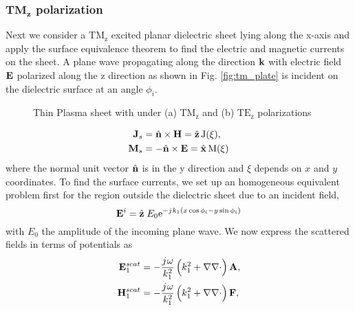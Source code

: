 \documentclass[12pt]{article}
\begin{document}
\subsubsection{$\mathbf{TM_z}$ polarization}
%
Next we consider a $\mathrm{TM_z}$ excited planar dielectric sheet lying along the x-axis and apply the surface equivalence theorem to find the electric and magnetic currents on the sheet. A plane wave propagating along the direction $\mathbf{k}$ with electric field $\mathbf{E}$ polarized along the z direction as shown in Fig. \ref{fig:tm_plate} is incident on the dielectric surface at an angle $\phi_i$.
%
\begin{figure}[b!]
  \centering
   \hfil
  \caption{Thin Plasma sheet with under (a) $\mathrm{TM_z}$ and (b) $\mathrm{TE_z}$ polarizations}
  \label{fig:thinsheets}
\end{figure}
%
\begin{subequations}
  \begin{align}
    \mathbf{J}_s &=  \hat{\mathbf{n}} \times \mathbf{H} = \hat {\mathbf{z}} \, \mathrm{J(\xi)},
    \label{eq:J_s}\\
    \mathbf{M}_s &=  -\hat{\mathbf{n}} \times \mathbf{E} = \hat {\mathbf{x}} \, \mathrm{M(\xi)}
    \label{eq:M_s}
  \end{align}
  \label{eq:eq_currents}%
\end{subequations}%
%
where the normal unit vector $\hat{\mathbf{n}}$ is in the y direction and $\xi$ depends on $x$ and $y$ coordinates. To find the surface currents, we set up an homogeneous equivalent problem first for the region outside the dielectric sheet due to an incident field,
%
\begin{equation}
  \mathbf{E}^i = \hat{\mathbf{z}} \; E_0  \mathrm{e}^{-{j}\mkern1mu k_1 (x \cos \phi_i - y \sin \phi_i)}
  \label{eq:E_i}
\end{equation}
%
with $E_0$ the amplitude of the incoming plane wave. We now express the scattered fields in terms of potentials as
%
\begin{subequations}
  \begin{align}
    \mathbf{E}_1^{scat} &=  -\frac{{j}\mkern1mu \omega}{k_1^2}\left( k_1^2 + \nabla \nabla \cdot \right) \mathbf{A},
    \label{eq:E1scat}\\
    \mathbf{H}_1^{scat} &=  -\frac{{j}\mkern1mu \omega}{k_1^2}\left( k_1^2 + \nabla \nabla \cdot \right) \mathbf{F},
    \label{eq:H1scat}
  \end{align}
  \label{eq:1scat_pot}%
\end{subequations}%
\end{document}
